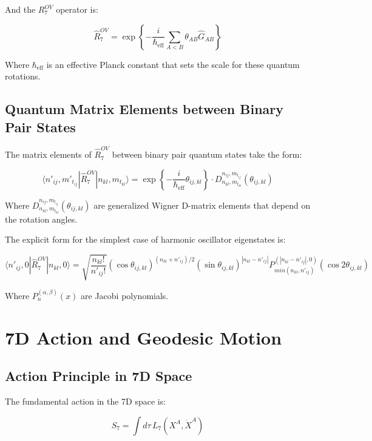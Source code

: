 \documentclass{article}
\begin{document}
And the $R^{OV}_7$ operator is:

\begin{equation}
\hat{R}^{OV}_7 = \exp\left\{-\frac{i}{\hbar_{\text{eff}}}\sum_{A<B} \theta_{AB} \hat{G}_{AB}\right\}
\end{equation}

Where $\hbar_{\text{eff}}$ is an effective Planck constant that sets the scale for these quantum rotations.

\subsection{Quantum Matrix Elements between Binary Pair States}

The matrix elements of $\hat{R}^{OV}_7$ between binary pair quantum states take the form:

\begin{equation}
\langle n'_{ij}, m'_{t_{ij}}|\hat{R}^{OV}_7|n_{kl}, m_{t_{kl}}\rangle = \exp\left\{-\frac{i}{\hbar_{\text{eff}}}\theta_{ij,kl}\right\} \cdot D^{n_{ij},m_{t_{ij}}}_{n_{kl},m_{t_{kl}}}(\theta_{ij,kl})
\end{equation}

Where $D^{n_{ij},m_{t_{ij}}}_{n_{kl},m_{t_{kl}}}(\theta_{ij,kl})$ are generalized Wigner D-matrix elements that depend on the rotation angles.

The explicit form for the simplest case of harmonic oscillator eigenstates is:

\begin{equation}
\langle n'_{ij}, 0|\hat{R}^{OV}_7|n_{kl}, 0\rangle = \sqrt{\frac{n_{kl}!}{n'_{ij}!}} (\cos\theta_{ij,kl})^{(n_{kl}+n'_{ij})/2} (\sin\theta_{ij,kl})^{|n_{kl}-n'_{ij}|} P^{(|n_{kl}-n'_{ij}|,0)}_{min(n_{kl},n'_{ij})}(\cos 2\theta_{ij,kl})
\end{equation}

Where $P^{(\alpha,\beta)}_n(x)$ are Jacobi polynomials.

\section{7D Action and Geodesic Motion}

\subsection{Action Principle in 7D Space}

The fundamental action in the 7D space is:

\begin{equation}
S_7 = \int d\tau \, L_7(X^A, \dot{X}^A)
\end{equation}
\end{document}
